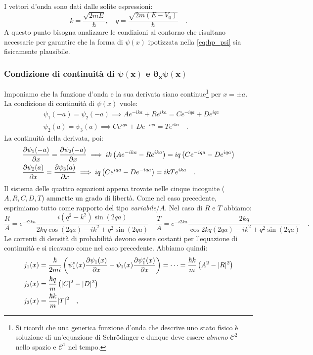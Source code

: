I vettori d'onda sono dati dalle solite espressioni:
\[
    k = \frac{\sqrt{2mE}}{\hbar}, \quad q = \frac{\sqrt{2m(E-V_0)}}{\hbar} \quad.
\]
A questo punto bisogna analizzare le condizioni al contorno che risultano necessarie per garantire che la forma di $\psi(x)$ ipotizzata nella \eqref{eq:hp_psi} sia fisicamente plausibile.

\subsubsection{Condizione di continuità di $\bm{\psi(x)}$ e $\bm{\partial_x\psi(x)}$}
Imponiamo che la funzione d'onda e la sua derivata siano continue\footnote{Si ricordi che una generica funzione d'onda che descrive uno stato fisico è soluzione di un'equazione di Schrödinger e dunque deve essere \emph{almeno} $\mathcal{C}^2$ nello spazio e $\mathcal{C}^1$ nel tempo.} per $x = \pm a$. La condizione di continuità di $\psi(x)$ vuole:
\[
    \begin{aligned}
        &\psi_1(-a) = \psi_2(-a) \implies Ae^{-ika} + Re^{ika} = Ce^{-iqa} + De^{iqa} \\
        &\psi_2(a) = \psi_3(a) \implies Ce^{iqa} + De^{-iqa} = Te^{ika} \quad.
    \end{aligned}
\]
La continuità della derivata, poi:
\[
    \begin{aligned}
        &\pdv{\psi_1(-a)}{x} = \pdv{\psi_2(-a)}{x} \implies ik\left(Ae^{-ika} - Re^{ika}\right) = iq\left(Ce^{-iqa} - De^{iqa}\right) \\
        &\pdv{\psi_2(a)}{x} = \pdv{\psi_3(a)}{x} \implies iq\left(Ce^{iqa} - De^{-iqa}\right) = ikTe^{ika} \quad.
    \end{aligned}
\]
Il sistema delle quattro equazioni appena trovate nelle cinque incognite ($A, R, C, D, T$) ammette un grado di libertà. Come nel caso precedente, esprimiamo tutto come rapporto del tipo \emph{variabile}/$A$. Nel caso di $R$ e $T$ abbiamo:
\[
   \frac{R}{A} = e^{-i2ka}\frac{i (q^2-k^2) \sin(2qa)}{2kq\cos(2qa) - i{k^2+q^2}\sin(2qa)} \quad \frac{T}{A} = e^{-i2ka}\frac{2kq}{\cos2kq(2qa) - i{k^2+q^2}\sin(2qa)} \quad.
\]
Le correnti di densità di probabilità devono essere costanti per l'equazione di continuità e si ricavano come nel caso precedente.  Abbiamo quindi:
\[
\begin{aligned}
    &j_1(x) = \frac{\hbar}{2mi} \left( \psi_1^*(x)\pdv{\psi_1(x)}{x} - \psi_1(x)\pdv{\psi_1^*(x)}{x} \right) = \dots = \frac{\hbar k}{m}\left( A^2 - |R|^2 \right) \\
    &j_2(x) = \frac{\hbar q}{m}\left( |C|^2 - |D|^2 \right) \\
    &j_3(x) = \frac{\hbar k}{m} |T|^2 \quad,
\end{aligned} 
\]
